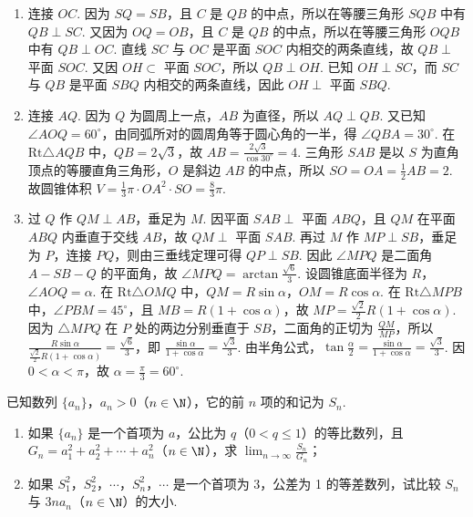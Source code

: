 \documentclass[UTF8,a4paper,oneside,11pt]{ctexbook}
\begin{document}
\begin{solution}

\begin{enumerate}
    \item 连接 \(OC\). 因为 \(SQ = SB\)，且 \(C\) 是 \(QB\) 的中点，所以在等腰三角形 \(SQB\) 中有 \(QB \perp SC\). 又因为 \(OQ = OB\)，且 \(C\) 是 \(QB\) 的中点，所以在等腰三角形 \(OQB\) 中有 \(QB \perp OC\). 直线 \(SC\) 与 \(OC\) 是平面 \(SOC\) 内相交的两条直线，故 \(QB \perp\) 平面 \(SOC\). 又因 \(OH\subset\) 平面 \(SOC\)，所以 \(QB\perp OH\). 已知 \(OH\perp SC\)，而 \(SC\) 与 \(QB\) 是平面 \(SBQ\) 内相交的两条直线，因此 \(OH\perp\) 平面 \(SBQ\).

    \item 连接 \(AQ\). 因为 \(Q\) 为圆周上一点，\(AB\) 为直径，所以 \(AQ\perp QB\). 又已知 \(\angle AOQ=60^{\circ}\)，由同弧所对的圆周角等于圆心角的一半，得 \(\angle QBA=30^{\circ}\). 在 \(\mathrm{Rt}\triangle AQB\) 中，\(QB=2\sqrt{3}\)，故 \(AB=\frac{2\sqrt{3}}{\cos30^{\circ}}=4\). 三角形 \(SAB\) 是以 \(S\) 为直角顶点的等腰直角三角形，\(O\) 是斜边 \(AB\) 的中点，所以 \(SO=OA=\frac{1}{2}AB=2\). 故圆锥体积 \(V=\frac{1}{3}\pi\cdot OA^2\cdot SO=\frac{8}{3}\pi\).

    \item 过 \(Q\) 作 \(QM\perp AB\)，垂足为 \(M\). 因平面 \(SAB\perp\) 平面 \(ABQ\)，且 \(QM\) 在平面 \(ABQ\) 内垂直于交线 \(AB\)，故 \(QM\perp\) 平面 \(SAB\). 再过 \(M\) 作 \(MP\perp SB\)，垂足为 \(P\)，连接 \(PQ\)，则由三垂线定理可得 \(QP\perp SB\). 因此 \(\angle MPQ\) 是二面角 \(A-SB-Q\) 的平面角，故 \(\angle MPQ=\arctan\frac{\sqrt{6}}{3}\). 设圆锥底面半径为 \(R\)，\(\angle AOQ=\alpha\). 在 \(\mathrm{Rt}\triangle OMQ\) 中，\(QM=R\sin\alpha\)，\(OM=R\cos\alpha\). 在 \(\mathrm{Rt}\triangle MPB\) 中，\(\angle PBM=45^{\circ}\)，且 \(MB=R(1+\cos\alpha)\)，故 \(MP=\frac{\sqrt{2}}{2}R(1+\cos\alpha)\). 因为 \(\triangle MPQ\) 在 \(P\) 处的两边分别垂直于 \(SB\)，二面角的正切为 \(\frac{QM}{MP}\)，所以 \(\frac{R\sin\alpha}{\frac{\sqrt{2}}{2}R(1+\cos\alpha)}=\frac{\sqrt{6}}{3}\)，即 \(\frac{\sin\alpha}{1+\cos\alpha}=\frac{\sqrt{3}}{3}\). 由半角公式，\(\tan\frac{\alpha}{2}=\frac{\sin\alpha}{1+\cos\alpha}=\frac{\sqrt{3}}{3}\). 因 \(0<\alpha<\pi\)，故 \(\alpha=\frac{\pi}{3}=60^{\circ}\).
\end{enumerate}
\end{solution}

\begin{problem}
已知数列 \(\{a_n\}\)，\(a_n > 0\)（\(n \in \N\)），它的前 \(n\) 项的和记为 \(S_n\).

\begin{enumerate}
\item 如果 \(\{a_n\}\) 是一个首项为 \(a\)，公比为 \(q\)（\(0 < q \leqslant 1\)）的等比数列，且 \(G_n = a_1^2 + a_2^2 + \cdots + a_n^2\)（\(n \in \N\)），求 \(\displaystyle\lim_{n \to \infty} \frac{S_n}{G_n}\)；
\item 如果 \(S_1^2\)，\(S_2^2\)，\(\cdots\)，\(S_n^2\)，\(\cdots\) 是一个首项为 3，公差为 1 的等差数列，试比较 \(S_n\) 与 \(3na_n\)（\(n \in \N\)）的大小.
\end{enumerate}
\end{problem}
\end{document}

